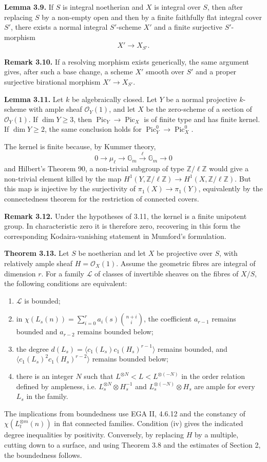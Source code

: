 \documentclass[11pt]{article}
\providecommand{\Pic}{\operatorname{Pic}}
\begin{document}
\textbf{Lemma 3.9.} If $S$ is integral noetherian and $X$ is integral over $S$, then after replacing $S$ by a non-empty open and then by a finite faithfully flat integral cover $S'$, there exists a normal integral $S'$-scheme $X'$ and a finite surjective $S'$-morphism
\[
 X'\longrightarrow X_{S'}.
\]

\textbf{Remark 3.10.} If a resolving morphism exists generically, the same argument gives, after such a base change, a scheme $X'$ smooth over $S'$ and a proper surjective birational morphism $X'\to X_{S'}$.

\textbf{Lemma 3.11.} Let $k$ be algebraically closed. Let $Y$ be a normal projective $k$-scheme with ample sheaf $\mathcal O_Y(1)$, and let $X$ be the zero-scheme of a section of $\mathcal O_Y(1)$. If $\dim Y\ge3$, then $\Pic_Y\to\Pic_X$ is of finite type and has finite kernel. If $\dim Y\ge2$, the same conclusion holds for $\Pic^0_Y\to\Pic^0_X$.

The kernel is finite because, by Kummer theory,
\[
0\to \mu_\ell\to \mathbb G_m\xrightarrow{\ell}\mathbb G_m\to0
\]
and Hilbert's Theorem 90, a non-trivial subgroup of type $\mathbb Z/\ell\mathbb Z$ would give a non-trivial element killed by the map $H^1(Y,\mathbb Z/\ell\mathbb Z)\to H^1(X,\mathbb Z/\ell\mathbb Z)$. But this map is injective by the surjectivity of $\pi_1(X)\to\pi_1(Y)$, equivalently by the connectedness theorem for the restriction of connected \etale{} covers.

\textbf{Remark 3.12.} Under the hypotheses of 3.11, the kernel is a finite unipotent group. In characteristic zero it is therefore zero, recovering in this form the corresponding Kodaira-vanishing statement in Mumford's formulation.

\textbf{Theorem 3.13.} Let $S$ be noetherian and let $X$ be projective over $S$, with relatively ample sheaf $H=\mathcal O_X(1)$. Assume the geometric fibres are integral of dimension $r$. For a family $\mathcal L$ of classes of invertible sheaves on the fibres of $X/S$, the following conditions are equivalent:
\begin{enumerate}[label=\roman*)]
\item $\mathcal L$ is bounded;
\item in $\chi(L_s(n))=\sum_{i=0}^r a_i(s)\binom{n+i}{i}$, the coefficient $a_{r-1}$ remains bounded and $a_{r-2}$ remains bounded below;
\item the degree $d(L_s)=\langle c_1(L_s)c_1(H_s)^{r-1}\rangle$ remains bounded, and $\langle c_1(L_s)^2c_1(H_s)^{r-2}\rangle$ remains bounded below;
\item there is an integer $N$ such that $L^{\otimes N}<L<L^{\otimes(-N)}$ in the order relation defined by ampleness, i.e. $L_s^{\otimes N}\otimes H_s^{-1}$ and $L_s^{\otimes(-N)}\otimes H_s$ are ample for every $L_s$ in the family.
\end{enumerate}
The implications from boundedness use EGA II, 4.6.12 and the constancy of $\chi(L_t^{\otimes m}(n))$ in flat connected families. Condition (iv) gives the indicated degree inequalities by positivity. Conversely, by replacing $H$ by a multiple, cutting down to a surface, and using Theorem 3.8 and the estimates of Section 2, the boundedness follows.
\end{document}
